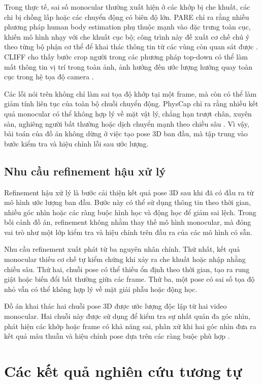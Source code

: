 \documentclass[../DoAn.tex]{subfiles}
\begin{document}
Trong thực tế, sai số monocular thường xuất hiện ở các khớp bị che khuất, các chi bị chồng lấp hoặc các chuyển động có biên độ lớn. PARE chỉ ra rằng nhiều phương pháp human body estimation phụ thuộc mạnh vào đặc trưng toàn cục, khiến mô hình nhạy với che khuất cục bộ; công trình này đề xuất cơ chế chú ý theo từng bộ phận cơ thể để khai thác thông tin từ các vùng còn quan sát được \cite{pare2021}. CLIFF cho thấy bước crop người trong các phương pháp top-down có thể làm mất thông tin vị trí trong toàn ảnh, ảnh hưởng đến ước lượng hướng quay toàn cục trong hệ tọa độ camera \cite{cliff2022}.

Các lỗi nói trên không chỉ làm sai tọa độ khớp tại một frame, mà còn có thể làm giảm tính liên tục của toàn bộ chuỗi chuyển động. PhysCap chỉ ra rằng nhiều kết quả monocular có thể không hợp lý về mặt vật lý, chẳng hạn trượt chân, xuyên sàn, nghiêng người bất thường hoặc dịch chuyển mạnh theo chiều sâu \cite{physcap2020}. Vì vậy, bài toán của đồ án không dừng ở việc tạo pose 3D ban đầu, mà tập trung vào bước kiểm tra và hiệu chỉnh lỗi sau ước lượng.

\subsection{Nhu cầu refinement hậu xử lý}
Refinement hậu xử lý là bước cải thiện kết quả pose 3D sau khi đã có đầu ra từ mô hình ước lượng ban đầu. Bước này có thể sử dụng thông tin theo thời gian, nhiều góc nhìn hoặc các ràng buộc hình học và động học để giảm sai lệch. Trong bối cảnh đồ án, refinement không nhằm thay thế mô hình monocular, mà đóng vai trò như một lớp kiểm tra và hiệu chỉnh trên đầu ra của các mô hình có sẵn.

Nhu cầu refinement xuất phát từ ba nguyên nhân chính. Thứ nhất, kết quả monocular thiếu cơ chế tự kiểm chứng khi xảy ra che khuất hoặc nhập nhằng chiều sâu. Thứ hai, chuỗi pose có thể thiếu ổn định theo thời gian, tạo ra rung giật hoặc biến đổi bất thường giữa các frame. Thứ ba, một pose có sai số tọa độ nhỏ vẫn có thể không hợp lý về mặt giải phẫu hoặc động học.

Đồ án khai thác hai chuỗi pose 3D được ước lượng độc lập từ hai video monocular. Hai chuỗi này được sử dụng để kiểm tra sự nhất quán đa góc nhìn, phát hiện các khớp hoặc frame có khả năng sai, phân xử khi hai góc nhìn đưa ra kết quả mâu thuẫn và hiệu chỉnh pose dựa trên các ràng buộc phù hợp \cite{vu2026multiperspective}.

\section{Các kết quả nghiên cứu tương tự}
\label{sec:related_work}
\end{document}
